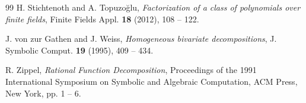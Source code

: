\documentclass{amsart}
\numberwithin{equation}{section}
\theoremstyle{definition}
\begin{document}
\begin{thebibliography}{99}
H. Stichtenoth and A. Topuzo\u glu, {\it Factorization of a class of polynomials over finite fields}, Finite Fields Appl. {\bf 18} (2012), 108 -- 122.

J. von zur Gathen and J. Weiss, 
{\it Homogeneous bivariate decompositions}, 
J. Symbolic Comput. {\bf 19} (1995), 409 -- 434. 

R. Zippel, {\it Rational Function Decomposition}, Proceedings of the 1991 International Symposium on Symbolic and Algebraic Computation, ACM Press, New York, pp. 1 -- 6.


\end{thebibliography}

\end{document}
